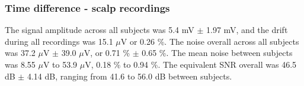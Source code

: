 
\subsubsection{Time difference - scalp recordings}
The signal amplitude across all subjects was 5.4 mV $\pm$ 1.97 mV, and the drift during all recordings was 15.1 $\mu$V or 0.26 \%. The noise overall across all subjects was 37.2 $\mu$V $\pm$ 39.0 $\mu$V, or 0.71 \% $\pm$ 0.65 \%. The mean noise between subjects was 8.55 $\mu$V to 53.9 $\mu$V, 0.18 \% to 0.94 \%. The equivalent SNR overall was 46.5 dB $\pm$ 4.14 dB, ranging from 41.6 to 56.0 dB between subjects. 
 
